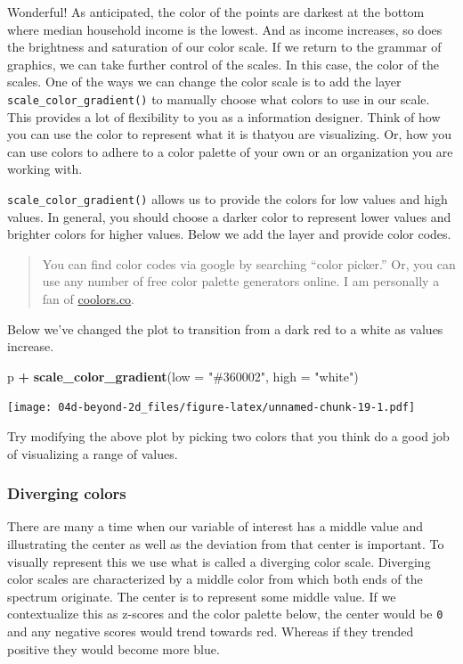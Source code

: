 \documentclass[
]{book}
\newenvironment{Shaded}{\begin{snugshade}}{\end{snugshade}}
\newcommand{\DataTypeTok}[1]{\textcolor[rgb]{0.13,0.29,0.53}{#1}}
\newcommand{\KeywordTok}[1]{\textcolor[rgb]{0.13,0.29,0.53}{\textbf{#1}}}
\newcommand{\NormalTok}[1]{#1}
\newcommand{\OperatorTok}[1]{\textcolor[rgb]{0.81,0.36,0.00}{\textbf{#1}}}
\newcommand{\StringTok}[1]{\textcolor[rgb]{0.31,0.60,0.02}{#1}}
\begin{document}
Wonderful! As anticipated, the color of the points are darkest at the bottom where median household income is the lowest. And as income increases, so does the brightness and saturation of our color scale. If we return to the grammar of graphics, we can take further control of the scales. In this case, the color of the scales. One of the ways we can change the color scale is to add the layer \texttt{scale\_color\_gradient()} to manually choose what colors to use in our scale. This provides a lot of flexibility to you as a information designer. Think of how you can use the color to represent what it is thatyou are visualizing. Or, how you can use colors to adhere to a color palette of your own or an organization you are working with.

\texttt{scale\_color\_gradient()} allows us to provide the colors for low values and high values. In general, you should choose a darker color to represent lower values and brighter colors for higher values. Below we add the layer and provide color codes.

\begin{quote}
You can find color codes via google by searching ``color picker.'' Or, you can use any number of free color palette generators online. I am personally a fan of \href{https://coolors.co}{coolors.co}.
\end{quote}

Below we've changed the plot to transition from a dark red to a white as values increase.

\begin{Shaded}
\begin{Highlighting}[]
\NormalTok{p }\OperatorTok{+}
\StringTok{  }\KeywordTok{scale\_color\_gradient}\NormalTok{(}\DataTypeTok{low =} \StringTok{"\#360002"}\NormalTok{, }\DataTypeTok{high =} \StringTok{"white"}\NormalTok{)}
\end{Highlighting}
\end{Shaded}

\texttt{[image: 04d-beyond-2d\_files/figure-latex/unnamed-chunk-19-1.pdf]}

Try modifying the above plot by picking two colors that you think do a good job of visualizing a range of values.

\hypertarget{diverging-colors}{%
\subsubsection{Diverging colors}\label{diverging-colors}}

There are many a time when our variable of interest has a middle value and illustrating the center as well as the deviation from that center is important. To visually represent this we use what is called a diverging color scale. Diverging color scales are characterized by a middle color from which both ends of the spectrum originate. The center is to represent some middle value. If we contextualize this as z-scores and the color palette below, the center would be \texttt{0} and any negative scores would trend towards red. Whereas if they trended positive they would become more blue.
\end{document}
